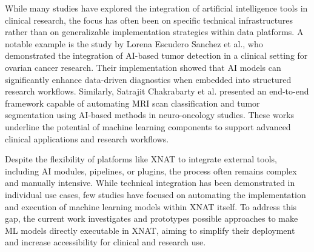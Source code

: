 While many studies have explored the integration of artificial intelligence tools in clinical research, the focus has often been on specific technical infrastructures rather than on generalizable implementation strategies within data platforms. A notable example is the study by Lorena Escudero Sanchez et al.\cite{escudero_sanchez_integrating_2023}, who demonstrated the integration of AI-based tumor detection in a clinical setting for ovarian cancer research. Their implementation showed that AI models can significantly enhance data-driven diagnostics when embedded into structured research workflows. Similarly, Satrajit Chakrabarty et al.\cite{chakrabarty_deep_2023} presented an end-to-end framework capable of automating \ac{MRI} scan classification and tumor segmentation using AI-based methods in neuro-oncology studies. These works underline the potential of machine learning components to support advanced clinical applications and research workflows.

Despite the flexibility of platforms like XNAT to integrate external tools, including AI modules, pipelines, or plugins, the process often remains complex and manually intensive. While technical integration has been demonstrated in individual use cases, few studies have focused on automating the implementation and execution of machine learning models within XNAT itself. To address this gap, the current work investigates and prototypes possible approaches to make \ac{ML} models directly executable in XNAT, aiming to simplify their deployment and increase accessibility for clinical and research use.
















 

